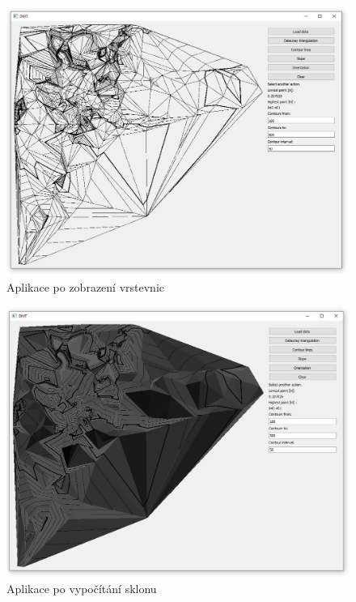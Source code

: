 \documentclass{article}
\begin{document}
\begin{figure}[hp]
\centering
        \includegraphics[trim=0cm 0cm 0cm 0cm, width=1\textwidth]{contours.jpg}
        \caption{Aplikace po zobrazení vrstevnic}
\end{figure}

\begin{figure}[hp]
\centering
        \includegraphics[trim=0cm 0cm 0cm 0cm, width=1\textwidth]{slope.jpg}
        \caption{Aplikace po vypočítání sklonu}
\end{figure}
\end{document}
